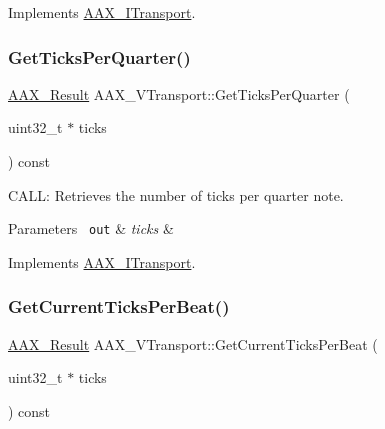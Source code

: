 Implements \mbox{\hyperlink{a01885_a51aebee28b9d285863c3527e936dd733}{A\+A\+X\+\_\+\+I\+Transport}}.

\mbox{\label{a01941_abe58c0dec6b49b78d9634da7cb2fa8d7}} 
\subsubsection{\texorpdfstring{GetTicksPerQuarter()}{GetTicksPerQuarter()}}
{\footnotesize\ttfamily \mbox{\hyperlink{a00392_a4d8f69a697df7f70c3a8e9b8ee130d2f}{A\+A\+X\+\_\+\+Result}} A\+A\+X\+\_\+\+V\+Transport\+::\+Get\+Ticks\+Per\+Quarter (\begin{DoxyParamCaption}\item[{uint32\+\_\+t $\ast$}]{ticks }\end{DoxyParamCaption}) const\hspace{0.3cm}{\ttfamily [virtual]}}



C\+A\+LL\+: Retrieves the number of ticks per quarter note. 


\begin{DoxyParams}[1]{Parameters}
\mbox{\texttt{ out}}  & {\em ticks} & \\
\hline
\end{DoxyParams}


Implements \mbox{\hyperlink{a01885_aa02b3ec8fd6059240260b67c256d9da8}{A\+A\+X\+\_\+\+I\+Transport}}.

\mbox{\label{a01941_a8df039482006decb5fa07cd464cdf402}} 
\subsubsection{\texorpdfstring{GetCurrentTicksPerBeat()}{GetCurrentTicksPerBeat()}}
{\footnotesize\ttfamily \mbox{\hyperlink{a00392_a4d8f69a697df7f70c3a8e9b8ee130d2f}{A\+A\+X\+\_\+\+Result}} A\+A\+X\+\_\+\+V\+Transport\+::\+Get\+Current\+Ticks\+Per\+Beat (\begin{DoxyParamCaption}\item[{uint32\+\_\+t $\ast$}]{ticks }\end{DoxyParamCaption}) const\hspace{0.3cm}{\ttfamily [virtual]}}



